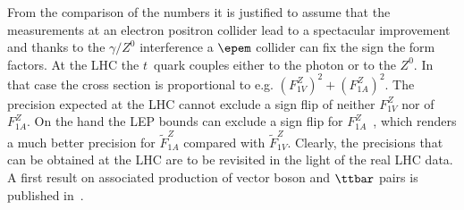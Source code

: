 From the comparison of the numbers it is justified to assume that the measurements at an electron positron collider lead to a spectacular improvement and thanks to the $\gamma/Z^0$ interference a $\epem$ collider can fix the sign the form factors. At the LHC the $t$~quark couples either to the photon or to the $Z^0$. In that case the cross section is proportional to e.g. $ (F^Z_{1V})^2 +  (F^Z_{1A})^2$. The precision expected at the LHC cannot exclude a sign flip of neither  $F^Z_{1V}$ nor of $F^Z_{1A}$. On the hand the LEP bounds can exclude a sign flip for $F^Z_{1A}$~\cite{Baur:2004uw}, which renders a much better precision for  $\widetilde F^Z_{1A}$ compared with $\widetilde F^Z_{1V}$. Clearly, the precisions that can be obtained at the LHC are to be revisited in the light of the real LHC data. A first result on associated production of vector boson and $\ttbar$ pairs is published in~\cite{Chatrchyan:2013qca}.



